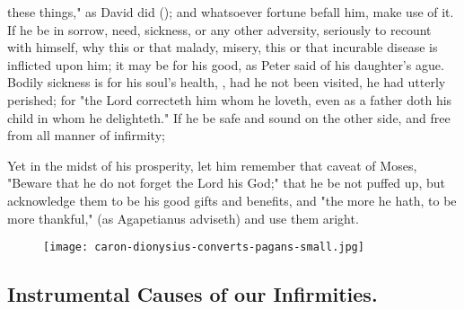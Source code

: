these things," as David did (); and
whatsoever fortune befall him, make use of it. If he be in sorrow, need,
sickness, or any other adversity, seriously to recount with himself, why this
or that malady, misery, this or that incurable disease is inflicted upon him;
it may be for his good,  as Peter said of
his daughter's ague. Bodily sickness is for his soul's health, , had he not been visited, he had utterly perished; for
"the Lord correcteth him whom he loveth, even as a father
doth his child in whom he delighteth." If he be safe and sound on the other
side, and free from all manner of infirmity; 


Yet in the midst of his prosperity, let him remember that caveat of Moses,
"Beware that he do not forget the Lord his God;" that he be
not puffed up, but acknowledge them to be his good gifts and benefits, and
"the more he hath, to be more thankful," (as Agapetianus
adviseth) and use them aright.

\cleartoleftpage{}
\begin{figure}[p]
  \begingroup
  \centering
  \texttt{[image: caron-dionysius-converts-pagans-small.jpg]}
  \label{fig:dionysiusconvertspagans}
\end{figure}
\restoregeometry

\clearpage{}
\subsection{Instrumental Causes of our Infirmities.}


